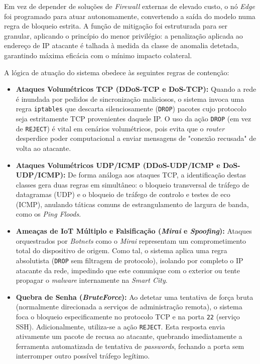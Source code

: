 Em vez de depender de soluções de \textit{Firewall} externas de elevado custo, o nó \textit{Edge} foi programado para atuar autonomamente, convertendo a saída do modelo numa regra de bloqueio estrita. A função de mitigação foi estruturada para ser granular, aplicando o princípio do menor privilégio: a penalização aplicada ao endereço de \ac{IP} atacante é talhada à medida da classe de anomalia detetada, garantindo máxima eficácia com o mínimo impacto colateral.

A lógica de atuação do sistema obedece às seguintes regras de contenção:

\begin{itemize}
    \item \textbf{Ataques Volumétricos TCP (\ac{DDoS}-\ac{TCP} e \ac{DoS}-\ac{TCP}):}
    Quando a rede é inundada por pedidos de sincronização maliciosos, o sistema invoca uma regra \texttt{iptables} que descarta silenciosamente (\texttt{DROP}) pacotes cujo protocolo seja estritamente \ac{TCP} provenientes daquele \ac{IP}. O uso da ação \texttt{DROP} (em vez de \texttt{REJECT}) é vital em cenários volumétricos, pois evita que o \textit{router} desperdice poder computacional a enviar mensagens de "conexão recusada" de volta ao atacante.

    \item \textbf{Ataques Volumétricos UDP/ICMP (\ac{DDoS}-\ac{UDP}/\ac{ICMP} e \ac{DoS}-\ac{UDP}/\ac{ICMP}):}
    De forma análoga aos ataques \ac{TCP}, a identificação destas classes gera duas regras em simultâneo: o bloqueio transversal de tráfego de datagramas (\ac{UDP}) e o bloqueio de tráfego de controlo e testes de eco (\ac{ICMP}), anulando táticas comuns de estrangulamento de largura de banda, como os \textit{Ping Floods}.

    \item \textbf{Ameaças de IoT Múltiplo e Falsificação (\textit{Mirai} e \textit{Spoofing}):}
    Ataques orquestrados por \textit{Botnets} como o \textit{Mirai} representam um comprometimento total do dispositivo de origem. Como tal, o sistema aplica uma regra absolutista (\texttt{DROP} sem filtragem de protocolo), isolando por completo o \ac{IP} atacante da rede, impedindo que este comunique com o exterior ou tente propagar o \textit{malware} internamente na \textit{Smart City}.

    \item \textbf{Quebra de Senha (\textit{BruteForce}):}
    Ao detetar uma tentativa de força bruta (normalmente direcionada a serviços de administração remota), o sistema foca o bloqueio especificamente no protocolo \ac{TCP} e na porta \texttt{22} (serviço SSH). Adicionalmente, utiliza-se a ação \texttt{REJECT}. Esta resposta envia ativamente um pacote de recusa ao atacante, quebrando imediatamente a ferramenta automatizada de tentativa de \textit{passwords}, fechando a porta sem interromper outro possível tráfego legítimo.
\end{itemize}

